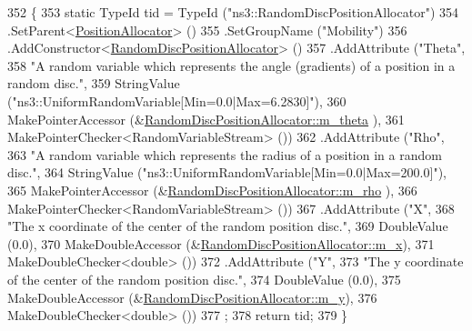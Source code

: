 \begin{DoxyCode}
352 \{
353   \textcolor{keyword}{static} TypeId tid = TypeId (\textcolor{stringliteral}{"ns3::RandomDiscPositionAllocator"})
354     .SetParent<\hyperlink{classns3_1_1PositionAllocator_a944cf6b97b874e06983c1f3e81cf3ea6}{PositionAllocator}> ()
355     .SetGroupName (\textcolor{stringliteral}{"Mobility"})
356     .AddConstructor<\hyperlink{classns3_1_1RandomDiscPositionAllocator_a236e67ae9a3e2e771a5087231bb01035}{RandomDiscPositionAllocator}> ()
357     .AddAttribute (\textcolor{stringliteral}{"Theta"},
358                    \textcolor{stringliteral}{"A random variable which represents the angle (gradients) of a position in a random
       disc."},
359                    StringValue (\textcolor{stringliteral}{"ns3::UniformRandomVariable[Min=0.0|Max=6.2830]"}),
360                    MakePointerAccessor (&\hyperlink{classns3_1_1RandomDiscPositionAllocator_ae31b2706470a36a86f55e80d30580a49}{RandomDiscPositionAllocator::m\_theta}
      ),
361                    MakePointerChecker<RandomVariableStream> ())
362     .AddAttribute (\textcolor{stringliteral}{"Rho"},
363                    \textcolor{stringliteral}{"A random variable which represents the radius of a position in a random disc."},
364                    StringValue (\textcolor{stringliteral}{"ns3::UniformRandomVariable[Min=0.0|Max=200.0]"}),
365                    MakePointerAccessor (&\hyperlink{classns3_1_1RandomDiscPositionAllocator_a2ece7a1600c3c7ca547e6b1f62408562}{RandomDiscPositionAllocator::m\_rho}
      ),
366                    MakePointerChecker<RandomVariableStream> ())
367     .AddAttribute (\textcolor{stringliteral}{"X"},
368                    \textcolor{stringliteral}{"The x coordinate of the center of the random position disc."},
369                    DoubleValue (0.0),
370                    MakeDoubleAccessor (&\hyperlink{classns3_1_1RandomDiscPositionAllocator_a8642f8019a3621ad5e70347afeccd4f8}{RandomDiscPositionAllocator::m\_x}),
371                    MakeDoubleChecker<double> ())
372     .AddAttribute (\textcolor{stringliteral}{"Y"},
373                    \textcolor{stringliteral}{"The y coordinate of the center of the random position disc."},
374                    DoubleValue (0.0),
375                    MakeDoubleAccessor (&\hyperlink{classns3_1_1RandomDiscPositionAllocator_a2ad7aee755524f830dd1c86b9d793495}{RandomDiscPositionAllocator::m\_y}),
376                    MakeDoubleChecker<double> ())
377   ;
378   \textcolor{keywordflow}{return} tid;
379 \}
\end{DoxyCode}


